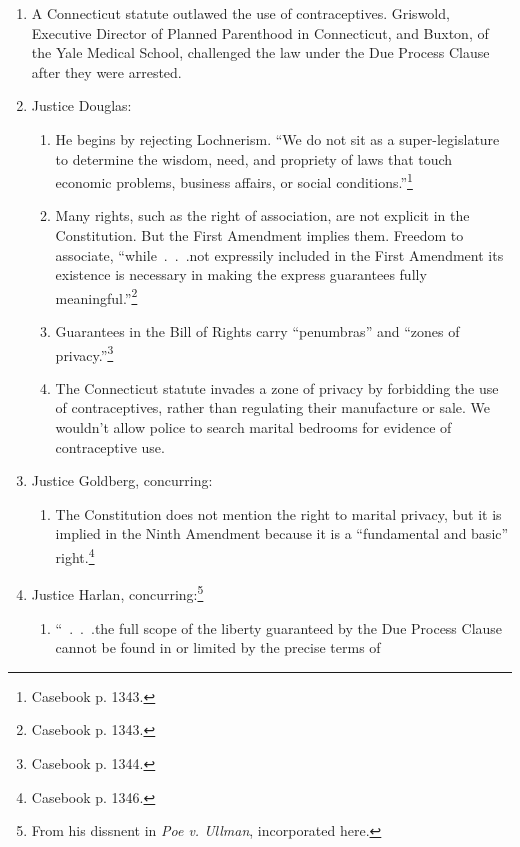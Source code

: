 \begin{enumerate}
    \item A Connecticut statute outlawed the use of contraceptives. Griswold, 
    Executive Director of Planned Parenthood in Connecticut, and Buxton, of 
    the Yale Medical School, challenged the law under the Due Process Clause 
    after they were arrested.
    \item Justice Douglas:
    \begin{enumerate}
        \item He begins by rejecting Lochnerism. ``We do not sit as a 
        super-legislature to determine the wisdom, need, and propriety of laws 
        that touch economic problems, business affairs, or social 
        conditions.''\footnote{Casebook p. 1343.}
        \item Many rights, such as the right of association, are not explicit 
        in the Constitution. But the First Amendment implies them. Freedom to 
        associate, ``while~.~.~.not expressily included in the First Amendment 
        its existence is necessary in making the express guarantees fully 
        meaningful.''\footnote{Casebook p. 1343.}
        \item Guarantees in the Bill of Rights carry ``penumbras'' and ``zones 
        of privacy.''\footnote{Casebook p. 1344.}
        \item The Connecticut statute invades a zone of privacy by forbidding 
        the use of contraceptives, rather than regulating their manufacture or 
        sale. We wouldn't allow police to search marital bedrooms for evidence 
        of contraceptive use.
    \end{enumerate}
    \item Justice Goldberg, concurring:
    \begin{enumerate}
        \item The Constitution does not mention the right to marital privacy, 
        but it is implied in the Ninth Amendment because it is a ``fundamental 
        and basic'' right.\footnote{Casebook p. 1346.}
    \end{enumerate}
    \item Justice Harlan, concurring:\footnote{From his dissnent in \emph{Poe 
    v. Ullman}, incorporated here.}
    \begin{enumerate}
        \item ``~.~.~.the full scope of the liberty guaranteed by the Due 
        Process Clause cannot be found in or limited by the precise terms of 

\end{enumerate}
\end{enumerate}
